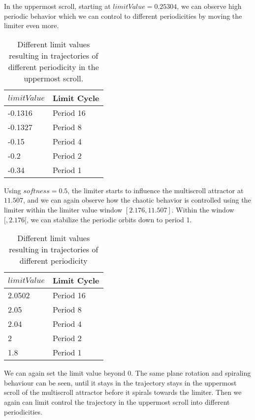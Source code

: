 \documentclass[main]{subfiles}
\begin{document}
In the uppermost scroll, starting at \(limitValue=0.25304\), we can observe high periodic behavior which we can control to different periodicities by moving the limiter even more. 

\begin{table}[H]
\renewcommand{\arraystretch}{1.2}
\center
\begin{tabular}{@{}ll@{}}
	\toprule
   \(limitValue\) & Limit Cycle\\
   \midrule
   -0.1316 & Period 16 \\
   -0.1327 & Period 8 \\ 
   -0.15 & Period 4 \\
   -0.2  & Period 2 \\
   -0.34 & Period 1 \\
   \bottomrule
\end{tabular}
\caption[Limiter values for periodic trajectories for for an x self-limiting limiter with softness 0.13]{Different limit values resulting in trajectories of different periodicity in the uppermost scroll.}
\label{table:x-0.13-periodicities}
\end{table}


Using \(softness=0.5\), the limiter starts to influence the multiscroll attractor at \(11.507\), and we can again observe how the chaotic behavior is controlled using the limiter within the limiter value window \([2.176,11.507]\). Within the window \([,2.176[\), we can stabilize the periodic orbits down to period 1.

\begin{table}[H]
\renewcommand{\arraystretch}{1.2}
\center
\begin{tabular}{@{}ll@{}}
	\toprule
   \(limitValue\) & Limit Cycle\\
   \midrule
   2.0502 & Period 16 \\
   2.05 & Period 8 \\ 
   2.04 & Period 4 \\
   2  & Period 2 \\
   1.8 & Period 1 \\
   \bottomrule
\end{tabular}
\caption{Different limit values resulting in trajectories of different periodicity}
\label{table:x-0.5-periodicities}
\end{table}

We can again set the limit value beyond 0. The same plane rotation and spiraling behaviour can be seen, until it stays in the trajectory stays in the uppermost scroll of the multiscroll attractor before it spirals towards the limiter. Then we again can limit control the trajectory in the uppermost scroll into different periodicities.
\end{document}
